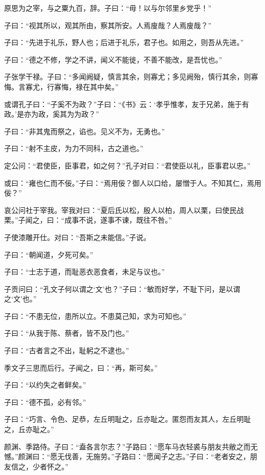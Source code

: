 \documentclass[a5paper]{ctexbook}
\begin{document}
    原思为之宰，与之粟九百，辞。子曰：“毋！以与尔邻里乡党乎！”

    子曰：“视其所以，观其所由，察其所安。人焉廋哉？人焉廋哉？”

    子曰：“先进于礼乐，野人也；后进于礼乐，君子也。如用之，则吾从先进。”

    子曰：“德之不修，学之不讲，闻义不能徙，不善不能改，是吾忧也。”

    子张学干禄。子曰：“多闻阙疑，慎言其余，则寡尤；多见阙殆，慎行其余，则寡悔。言寡尤，行寡悔，禄在其中矣。”

    或谓孔子曰：“子奚不为政？”子曰：“《书》云：‘孝乎惟孝，友于兄弟，施于有政。’是亦为政，奚其为为政？”

    子曰：“非其鬼而祭之，谄也。见义不为，无勇也。”

    子曰：“射不主皮，为力不同科，古之道也。”

    

    定公问：“君使臣，臣事君，如之何？”孔子对曰：“君使臣以礼，臣事君以忠。”

    或曰：“雍也仁而不佞。”子曰：“焉用佞？御人以口给，屡憎于人。不知其仁，焉用佞？”

    哀公问社于宰我。宰我对曰：“夏后氏以松，殷人以柏，周人以栗，曰使民战栗。”子闻之，曰：“成事不说，遂事不谏，既往不咎。”

    子使漆雕开仕。对曰：“吾斯之未能信。”子说。
    
    子曰：“朝闻道，夕死可矣。”
    
    子曰：“士志于道，而耻恶衣恶食者，未足与议也。”

    子贡问曰：“孔文子何以谓之‘文’也？”子曰：“敏而好学，不耻下问，是以谓之‘文’也。”

    子曰：“不患无位，患所以立。不患莫己知，求为可知也。”

    子曰：“从我于陈、蔡者，皆不及门也。”

    子曰：“古者言之不出，耻躬之不逮也。”

    季文子三思而后行。子闻之，曰：“再，斯可矣。”
    
    子曰：“以约失之者鲜矣。”

    子曰：“德不孤，必有邻。”

    子曰：“巧言、令色、足恭，左丘明耻之，丘亦耻之。匿怨而友其人，左丘明耻之，丘亦耻之。”

    颜渊、季路侍。子曰：“盍各言尔志？”子路曰：“愿车马衣轻裘与朋友共敝之而无憾。”颜渊曰：“愿无伐善，无施劳。”子路曰：“愿闻子之志。”子曰：“老者安之，朋友信之，少者怀之。”

    
\end{document}
